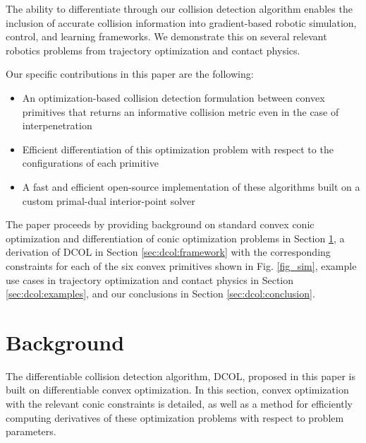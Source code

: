 The ability to differentiate through our collision detection algorithm enables the inclusion of accurate collision information into gradient-based robotic simulation, control, and learning frameworks. We demonstrate this on several relevant robotics problems from trajectory optimization and contact physics. 

Our specific contributions in this paper are the following:
\begin{itemize}
    \item An optimization-based collision detection formulation between convex primitives that returns an informative collision metric even in the case of interpenetration
    \item Efficient differentiation of this optimization problem with respect to the configurations of each primitive 
    \item A fast and efficient open-source implementation of these algorithms built on a custom primal-dual interior-point solver
\end{itemize}

The paper proceeds by providing background on standard convex conic optimization and differentiation of conic optimization problems in Section \ref{sec:dcol:conic_opt}, a derivation of DCOL in Section \ref{sec:dcol:framework} with the corresponding constraints for each of the six convex primitives shown in Fig. \ref{fig_sim}, example use cases in trajectory optimization and contact physics in Section \ref{sec:dcol:examples}, and our conclusions in Section \ref{sec:dcol:conclusion}.

 \section{Background} \label{sec:dcol:conic_opt}
 The differentiable collision detection algorithm, DCOL, proposed in this paper is built on differentiable convex optimization. In this section, convex optimization with the relevant conic constraints is detailed, as well as a method for efficiently computing derivatives of these optimization problems with respect to problem parameters. 
